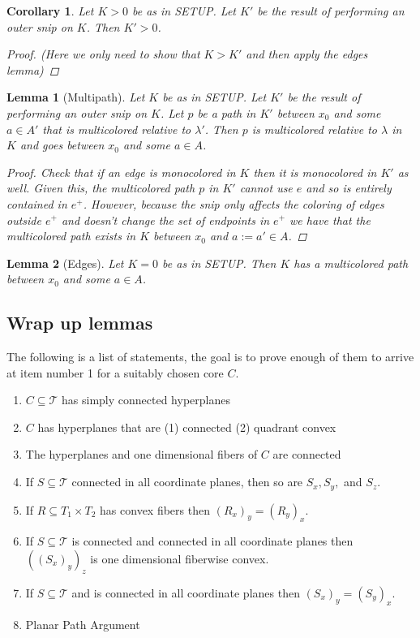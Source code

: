 \documentclass{article}
\newcommand{\sxyz}{((S_x)_y)_z}
\theoremstyle{mystyle}
\newtheorem{lem}{Lemma}[section]
\newtheorem*{cor*}{Corollary}
\theoremstyle{remark}
\begin{document}
\begin{cor*}
	Let \(K > 0\) be as in SETUP. Let \(K'\) be the result of performing an outer snip on \(K\). Then \(K' > 0\).
	\begin{proof}
        (Here we only need to show that \(K > K'\) and then apply the edges lemma)
		
	\end{proof}
\end{cor*}
\begin{lem}
	[Multipath]
	 \label{lem:multi} 
	Let \(K\) be as in SETUP. Let \(K'\) be the result of performing an outer snip on \(K\). Let \(p\) be a path in \(K'\) between \(x_{0}\) and some \(a \in A'\) that is {\em multicolored} relative to \(\lambda'\). Then \(p\) is multicolored relative to \(\lambda\) in \(K\) and goes between \(x_{0}\) and some \(a \in A\).
	\begin{proof}
		Check that if an edge is monocolored in \(K\) then it is monocolored in \(K'\) as well. Given this, the multicolored path \(p\) in \(K'\) cannot use \(e\) and so is entirely contained in \(e^{+}\). However, because the snip only affects the coloring of edges outside \(e^{+}\) and doesn't change the set of endpoints in \(e^{+}\) we have that the multicolored path exists in \(K\) between \(x_{0}\) and \(a:=a' \in A\).
	\end{proof}
\end{lem}
\begin{lem}
	[Edges]
	 \label{edges} 
	  Let \(K=0\) be as in SETUP. Then \(K\) has a multicolored path between \(x_{0}\) and some \(a \in A\).
\end{lem}%

\subsection{Wrap up lemmas}
The following is a list of statements, the goal is to prove enough of them to arrive at item number 1 for a suitably chosen core \(C\).
\begin{enumerate}
    \item \(C \subseteq \mathscr{T}\) has simply connected hyperplanes
    \item \(C\) has hyperplanes that are (1) connected (2) quadrant convex
    \item The hyperplanes and one dimensional fibers of \(C\) are connected
    \item If \(S \subseteq \mathscr{T}\) connected in all coordinate planes, then so are \(S_{x}, S_{y},\) and \(S_{z}\).
    \item If \(R \subseteq T_{1} \times T_{2}\) has convex fibers then \( \left( R_{x} \right)_{y} = \left( R_{y} \right)_{x}\).
    \item If \(S \subseteq \mathscr{T}\) is connected and connected in all coordinate planes then \(\sxyz\) is one dimensional fiberwise convex. 
    \item If \(S \subseteq \mathscr{T}\) and is connected in all coordinate planes then \( \left( S_{x} \right)_{y} = \left( S_{y} \right)_{x}\).
    \item Planar Path Argument
\end{enumerate}
\end{document}
